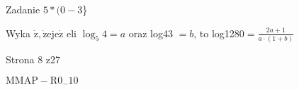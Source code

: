 \documentclass[a4paper,12pt]{article}
\begin{document}
Zadanie $5*(0-3$\}

Wyka $\dot{\mathrm{z}}, \dot{\mathrm{z}}\mathrm{e}\mathrm{j}\mathrm{e}\dot{\mathrm{z}}$ eli $\log_{5}4=a$ oraz log43 $=b$, to log1280$=\displaystyle \frac{2a+1}{a\cdot(1+b)}$

Strona 8 z27

$\mathrm{M}\mathrm{M}\mathrm{A}\mathrm{P}-\mathrm{R}0_{-}10$
\end{document}
